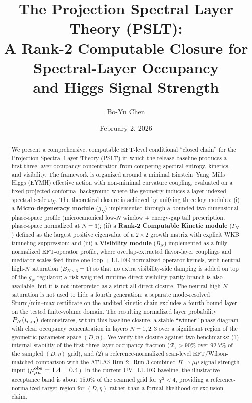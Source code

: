 \documentclass[aps,prd,onecolumn,notitlepage,nofootinbib,superscriptaddress,11pt,floatfix]{revtex4-2}
\begin{document}
\title{\Large \bf \texorpdfstring{The Projection Spectral Layer Theory (PSLT):\\ A Rank-2 Computable Closure for Spectral-Layer Occupancy\\ and Higgs Signal Strength}{The Projection Spectral Layer Theory (PSLT): A Rank-2 Computable Closure for Spectral-Layer Occupancy and Higgs Signal Strength}}

\author{Bo-Yu Chen}

\date{February 2, 2026}

\begin{abstract}
We present a comprehensive, computable EFT-level conditional ``closed chain'' for the Projection Spectral Layer Theory (PSLT) in which the release baseline produces a first-three-layer occupancy concentration from competing spectral entropy, kinetics, and visibility.
The framework is organized around a minimal Einstein--Yang--Mills--Higgs (EYMH) effective action with non-minimal curvature coupling, evaluated on a fixed projected conformal background where the geometry induces a layer-indexed spectral scale $\omega_N$.
The theoretical closure is achieved by unifying three key modules:
(i) a \textbf{Micro-degeneracy module} ($g_N$) implemented through a bounded two-dimensional phase-space profile (microcanonical low-$N$ window + energy-gap tail prescription, phase-space normalized at $N=3$);
(ii) a \textbf{Rank-2 Computable Kinetic module} ($\Gamma_N$) defined as the largest positive eigenvalue of a $2\times2$ growth matrix with explicit WKB tunneling suppression; and
(iii) a \textbf{Visibility module} ($B_N$) implemented as a fully normalized EFT-operator profile, where overlap-extracted flavor-layer couplings and mediator scales feed finite one-loop + LL-RG-normalized operator kernels, with neutral high-$N$ saturation ($B_{N>3}=1$) so that no extra visibility-side damping is added on top of the $g_N$ regulator; a risk-weighted runtime-direct visibility parity branch is also available, but it is not interpreted as a strict all-direct closure.
The neutral high-$N$ saturation is not used to hide a fourth generation: a separate mode-resolved Sturm/min--max certificate on the audited kinetic chain excludes a fourth bound layer on the tested finite-volume domain.
The resulting normalized layer probability $P_N(t_{\rm coh})$ demonstrates, within this baseline closure, a stable ``winner'' phase diagram with clear occupancy concentration in layers $N=1,2,3$ over a significant region of the geometric parameter space $(D, \eta)$.
We verify the closure against two benchmarks: (1) internal stability of the first-three-layer occupancy fraction ($\mathcal{R}_3>90\%$ over $92.7\%$ of the sampled $(D,\eta)$ grid), and (2) a reference-normalized scan-level EFT/Wilson-matched comparison with the ATLAS Run-2+Run-3 combined $H\to\mu\mu$ signal-strength input ($\mu_{\mu\mu}^{\rm obs}=1.4\pm0.4$).
In the current UV+LL-RG baseline, the illustrative acceptance band is about $15.0\%$ of the scanned grid for $\chi^2<4$, providing a reference-normalized target region for $(D,\eta)$ rather than a formal likelihood or exclusion claim.
\end{abstract}
\end{document}
